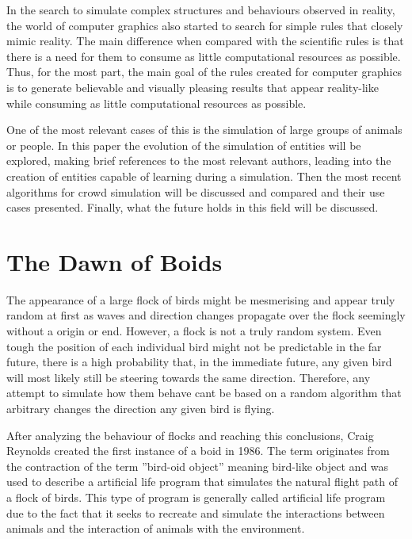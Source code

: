 \documentclass[sigconf]{acmart}
\begin{document}
In the search to simulate complex structures and behaviours observed in reality,
the world of computer graphics also started to search for simple rules that closely
mimic reality. The main difference when compared with the scientific rules is that
there is a need for them to consume as little computational resources as possible.
Thus, for the most part, the main goal of the rules created for computer graphics
is to generate believable and visually pleasing results that appear reality-like
while consuming as little computational resources as possible.

One of the most relevant cases of this is the simulation of large groups of
animals or people. In this paper the evolution of the simulation of entities will
be explored, making brief references to the most relevant authors, leading into the
creation of entities capable of learning during a simulation. Then the most recent
algorithms for crowd simulation will be discussed and compared and their use cases
presented. Finally, what the future holds in this field will be discussed. 

\section{The Dawn of Boids}

The appearance of a large flock of birds might be mesmerising and appear truly
random at first as waves and direction changes propagate over the flock seemingly
without a origin or end. However, a flock is not a truly random system. Even tough
the position of each individual bird might not be predictable in the far future,
there is a high probability that, in the immediate future, any given bird will most
likely still be steering towards the same direction. Therefore, any attempt to simulate
how them behave cant be based on a random algorithm that arbitrary changes the
direction any given bird is flying.

After analyzing the behaviour of flocks and reaching this conclusions, Craig Reynolds
created the first instance of a boid in 1986\cite{Reynolds1987}. The term originates from
the contraction of the term ''bird-oid object'' meaning bird-like object and was used 
to describe a artificial life program that simulates the natural flight path of
a flock of birds. This type of program is generally called artificial life program
due to the fact that it seeks to recreate and simulate the interactions between animals
and the interaction of animals with the environment.
\end{document}
